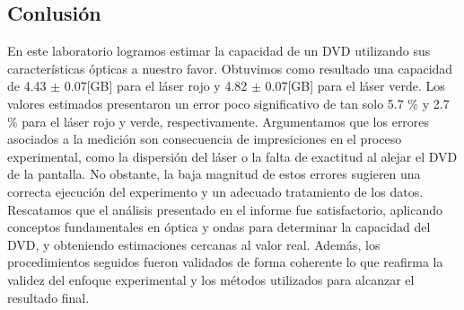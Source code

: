 \documentclass[10pt,a4paper]{article}
\begin{document}
\begin{multicols}{2}
	
\section{Conlusión}
En este laboratorio logramos estimar la capacidad de un DVD utilizando sus características ópticas a nuestro favor. Obtuvimos como resultado una capacidad de  4.43 $\pm$ 0.07[GB] para el láser rojo y 4.82 $\pm$ 0.07[GB] para el láser verde. Los valores estimados presentaron un error poco significativo de tan solo 5.7 $\%$  y 2.7 $\%$ para el láser rojo y  verde, respectivamente.  Argumentamos que los errores asociados a la medición son consecuencia de impresiciones en el proceso experimental, como la dispersión del láser o la falta de exactitud al  alejar el DVD de la pantalla.  No obstante, la baja magnitud de estos errores sugieren una correcta ejecución del experimento y un adecuado tratamiento de los datos. Rescatamos que el análisis presentado en el informe fue satisfactorio, aplicando conceptos fundamentales en óptica y ondas para determinar la capacidad del DVD, y obteniendo estimaciones cercanas al valor real. Además, los procedimientos seguidos fueron validados de forma coherente lo que reafirma la validez del enfoque experimental y los métodos utilizados para alcanzar el resultado final. 




	
	
	
	\end{multicols}
\end{document}
